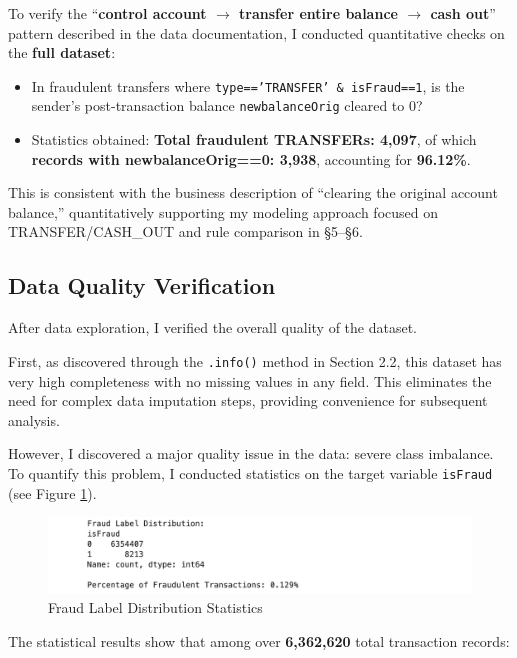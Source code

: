 \documentclass[sigplan,screen]{acmart}
\begin{document}
To verify the ``\textbf{control account $\rightarrow$ transfer entire balance $\rightarrow$ cash out}'' pattern described in the data documentation, I conducted quantitative checks on the \textbf{full dataset}:

\begin{itemize}
    \item In fraudulent transfers where \texttt{type=='TRANSFER' \& isFraud==1}, is the sender's post-transaction balance \texttt{newbalanceOrig} cleared to 0?
    \item Statistics obtained: \textbf{Total fraudulent TRANSFERs: 4,097}, of which \textbf{records with newbalanceOrig==0: 3,938}, accounting for \textbf{96.12\%}.
    \end{itemize}

This is consistent with the business description of ``clearing the original account balance,'' quantitatively supporting my modeling approach focused on TRANSFER/CASH\_OUT and rule comparison in \S5--\S6.

\subsection{Data Quality Verification}

After data exploration, I verified the overall quality of the dataset.

First, as discovered through the \texttt{.info()} method in Section 2.2, this dataset has very high completeness with no missing values in any field. This eliminates the need for complex data imputation steps, providing convenience for subsequent analysis.

However, I discovered a major quality issue in the data: severe class imbalance. To quantify this problem, I conducted statistics on the target variable \texttt{isFraud} (see Figure \ref{fig:class_imbalance}).

\begin{figure}[h!]
    \centering
    \includegraphics[width=0.9\columnwidth]{2.4.png}
    \caption{Fraud Label Distribution Statistics}
    \label{fig:class_imbalance}
\end{figure}

The statistical results show that among over \textbf{6,362,620} total transaction records:
\end{document}
